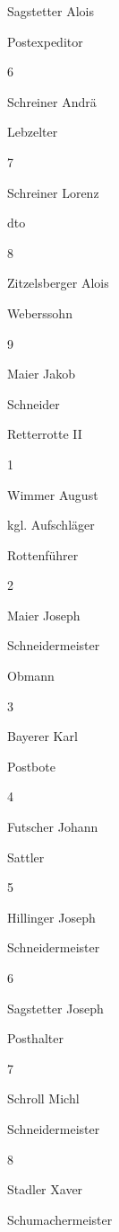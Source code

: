 \documentclass{book}
\begin{document}
Sagstetter Alois

Postexpeditor



6

Schreiner Andrä

Lebzelter



7

Schreiner Lorenz

dto



8

Zitzelsberger Alois

Weberssohn



9

Maier Jakob

Schneider





Retterrotte II

1

Wimmer August

kgl. Aufschläger

Rottenführer

2

Maier Joseph

Schneidermeister

Obmann

3

Bayerer Karl

Postbote



4

Futscher Johann

Sattler



5

Hillinger Joseph

Schneidermeister



6

Sagstetter Joseph

Posthalter



7

Schroll Michl

Schneidermeister



8

Stadler Xaver

Schumachermeister
\end{document}
